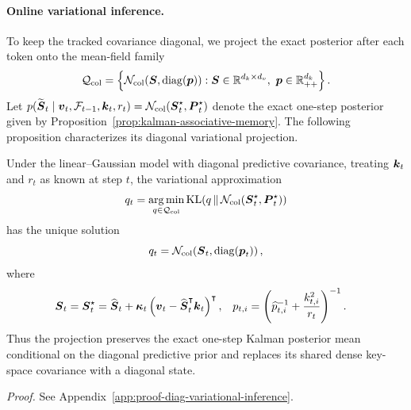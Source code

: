 \documentclass{article} %
\begin{document}
\paragraph{Online variational inference.}
To keep the tracked covariance diagonal, we project the exact posterior after each token onto
the mean-field family
\begin{equation}
  \mathcal{Q}_{\mathrm{col}}
  =\left\{
    \mathcal N_{\mathrm{col}}(\boldsymbol{S},\operatorname{diag}(\boldsymbol{p})):
    \boldsymbol{S}\in\mathbb{R}^{d_k\times d_v},\ \boldsymbol{p}\in\mathbb{R}_{++}^{d_k}
  \right\}.
  \label{eq:diag-variational-family}
\end{equation}
Let $p(\widetilde{\boldsymbol{S}}_t\mid\boldsymbol{v}_t,\mathcal{F}_{t-1},\boldsymbol{k}_t,r_t)
=\mathcal N_{\mathrm{col}}(\boldsymbol{S}_t^\star,\boldsymbol{P}_t^\star)$ denote the exact one-step posterior given by
Proposition~\ref{prop:kalman-associative-memory}. The following proposition characterizes its
diagonal variational projection.

\begin{proposition}
\label{prop:diag-variational-inference}
Under the linear--Gaussian model with diagonal predictive covariance, treating $\boldsymbol{k}_t$ and $r_t$ as known at step $t$,
the variational approximation
\begin{equation}
  q_t
  =\operatorname*{arg\,min}_{q\in\mathcal{Q}_{\mathrm{col}}}
    \operatorname{KL}\!\left(
      q\,\|\,\mathcal N_{\mathrm{col}}(\boldsymbol{S}_t^\star,\boldsymbol{P}_t^\star)
    \right)
  \label{eq:diag-variational-objective}
\end{equation}
has the unique solution
\begin{equation}
  q_t
  =\mathcal N_{\mathrm{col}}\!\left(
      \boldsymbol{S}_t,\operatorname{diag}(\boldsymbol{p}_t)
    \right),
  \label{eq:diag-variational-posterior}
\end{equation}
where
\begin{equation}
\begin{aligned}
  \boldsymbol{S}_t
  &=\boldsymbol{S}_t^\star
    =\widehat{\boldsymbol{S}}_t
    +\boldsymbol{\kappa}_t
      \left(\boldsymbol{v}_t-\widehat{\boldsymbol{S}}_t^{\intercal}\boldsymbol{k}_t\right)^{\intercal},
  &
  p_{t,i}
  &=\left(\widehat p_{t,i}^{-1}+\frac{k_{t,i}^2}{r_t}\right)^{-1}.
\end{aligned}
  \label{eq:diag-variational-solution}
\end{equation}
Thus the projection preserves the exact one-step Kalman posterior mean conditional on the diagonal
predictive prior and replaces its shared dense key-space covariance with a diagonal state.
\end{proposition}

\noindent\textit{Proof.} See Appendix~\ref{app:proof-diag-variational-inference}.
\end{document}
